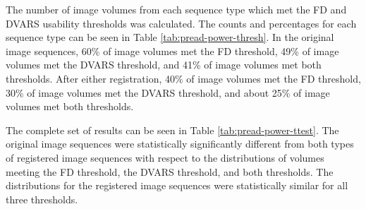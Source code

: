 The number of image volumes from each sequence type which met the FD and DVARS usability thresholds was calculated. The counts and percentages for each sequence type can be seen in Table \ref{tab:pread-power-thresh}. In the original image sequences, 60\% of image volumes met the FD threshold, 49\% of image volumes met the DVARS threshold, and 41\% of image volumes met both thresholds. After either registration, 40\% of image volumes met the FD threshold, 30\% of image volumes met the DVARS threshold, and about 25\% of image volumes met both thresholds.

The complete set of results can be seen in Table \ref{tab:pread-power-ttest}. The original image sequences were statistically significantly different from both types of registered image sequences with respect to the distributions of volumes meeting the FD threshold, the DVARS threshold, and both thresholds. The distributions for the registered image sequences were statistically similar for all three thresholds. 


